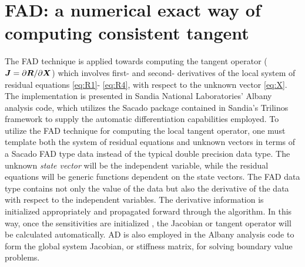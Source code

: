 \section{FAD: a numerical exact way of computing consistent tangent}

The FAD technique is applied towards computing the tangent operator ($
{\boldsymbol{J}} = \partial{\boldsymbol{R}} / \partial{\boldsymbol{X}}$) which involves first- and second-
derivatives of the local system of residual equations \eqref{eq:R1}-
\eqref{eq:R4}, with respect to the unknown vector \eqref{eq:X}. The 
implementation is presented in Sandia National Laboratories' Albany 
analysis code\cite{Salinger2013}, which utilizes the Sacado package 
contained in Sandia's Trilinos framework to supply the 
automatic differentiation capabilities employed. To utilize the FAD 
technique for computing the local tangent operator, one must template 
both the system of residual equations and unknown vectors in terms of 
a Sacado FAD type data instead of the typical double precision data 
type. The unknown {\em state vector} will be the independent variable, 
while the residual equations will be generic functions dependent on 
the state vectors. The FAD data type contains not only the value of 
the data but also the derivative of the data with respect to the 
independent variables. The derivative information is initialized 
appropriately and propagated forward through the algorithm. In this 
way, once the sensitivities are initialized , the Jacobian or tangent 
operator will be calculated automatically. AD is also employed in the 
Albany analysis code to form the global system Jacobian, or 
stiffness matrix, for solving boundary value problems.

